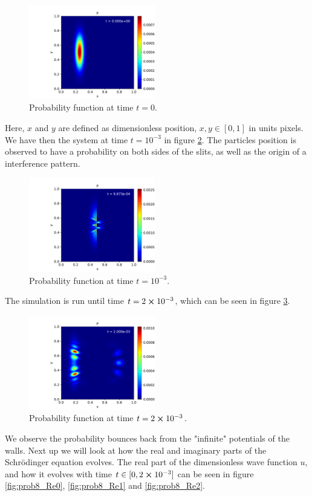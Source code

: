 \documentclass[english,notitlepage,reprint,nofootinbib]{revtex4-2}  %
\begin{document}
	\begin{figure}[H]
		\centering
		\includegraphics[width=0.49\textwidth]{figures/problem8_P_0.000.pdf}
		\caption{Probability function at time $t=0$.}
		\label{fig:prob_P0}
	\end{figure}
	Here, $x$ and $y$ are defined as dimensionless position, $x, y\in[0, 1]$ in units pixels. We have then the system at time $t = 10^{-3}$ in figure \ref{fig:prob8_P1}. The particles position is observed to have a probability on both sides of the slits, as well as the origin of a interference pattern.

	\begin{figure}[H]
		\centering
		\includegraphics[width=0.49\textwidth]{figures/problem8_P_0.001.pdf}
		\caption{Probability function at time $t=10^{-3}$.}
		\label{fig:prob8_P1}
	\end{figure}
	The simulation is run until time $t=2\cross10^{-3}$, which can be seen in figure \ref{fig:prob8_P2}.

	\begin{figure}[H]
		\centering
		\includegraphics[width=0.49\textwidth]{figures/problem8_P_0.002.pdf}
		\caption{Probability function at time $t=2\cross10^{-3}$.}
		\label{fig:prob8_P2}
	\end{figure}
	We observe the probability bounces back from the "infinite" potentials of the walls. Next up we will look at how the real and imaginary parts of the Schrödinger equation evolves. The real part of the dimensionless wave function $u$, and how it evolves with time $t \in[0, 2\cross10^{-3}]$ can be seen in figure \ref{fig:prob8_Re0}, \ref{fig:prob8_Re1} and \ref{fig:prob8_Re2}.
\end{document}
